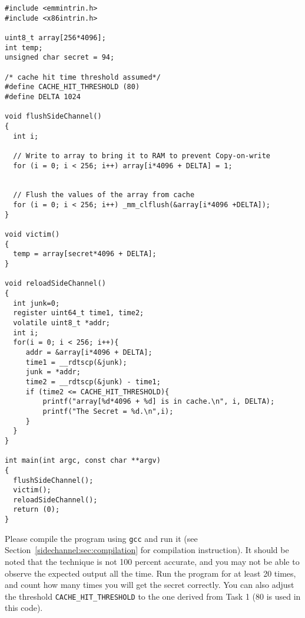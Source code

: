 \begin{lstlisting}[caption=\texttt{FlushReload.c}, label={sidechannel:list:flushreload}]
#include <emmintrin.h>
#include <x86intrin.h>

uint8_t array[256*4096];
int temp;
unsigned char secret = 94;

/* cache hit time threshold assumed*/
#define CACHE_HIT_THRESHOLD (80)
#define DELTA 1024

void flushSideChannel()
{
  int i;

  // Write to array to bring it to RAM to prevent Copy-on-write
  for (i = 0; i < 256; i++) array[i*4096 + DELTA] = 1;


  // Flush the values of the array from cache
  for (i = 0; i < 256; i++) _mm_clflush(&array[i*4096 +DELTA]);
}

void victim()
{
  temp = array[secret*4096 + DELTA];
}

void reloadSideChannel() 
{
  int junk=0;
  register uint64_t time1, time2;
  volatile uint8_t *addr;
  int i;
  for(i = 0; i < 256; i++){
     addr = &array[i*4096 + DELTA];
     time1 = __rdtscp(&junk);
     junk = *addr;
     time2 = __rdtscp(&junk) - time1;
     if (time2 <= CACHE_HIT_THRESHOLD){
         printf("array[%d*4096 + %d] is in cache.\n", i, DELTA);
         printf("The Secret = %d.\n",i);
     }
  }	
}

int main(int argc, const char **argv) 
{
  flushSideChannel();
  victim();
  reloadSideChannel();
  return (0);
}
\end{lstlisting}
 

Please compile the program using \texttt{gcc} and run it (see Section~\ref{sidechannel:sec:compilation}
for compilation instruction).
It should be noted that the technique is not 100 percent accurate, and you may not 
be able to observe the expected output all the time. 
Run the program for at least 20 times, and count how many times 
you will get the secret correctly. You can also adjust the 
threshold \texttt{CACHE\_HIT\_THRESHOLD} to the one derived from
Task 1 (80 is used in this code). 


